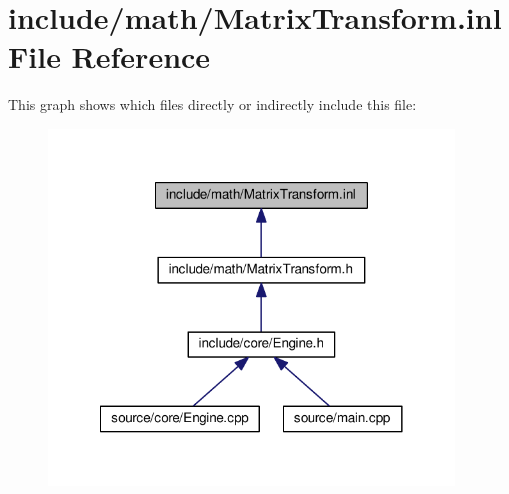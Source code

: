 \hypertarget{MatrixTransform_8inl}{\section{include/math/\-Matrix\-Transform.inl File Reference}
\label{MatrixTransform_8inl}
}
This graph shows which files directly or indirectly include this file\-:
\nopagebreak
\begin{figure}[H]
\begin{center}
\leavevmode
\includegraphics[width=305pt]{MatrixTransform_8inl__dep__incl}
\end{center}
\end{figure}
